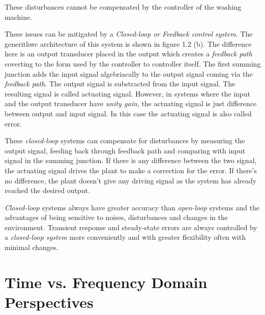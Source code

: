 \documentclass{report}
\begin{document}
These disturbances cannot be compensated by the controller of the washing machine.
\\
\par
These issues can be mitigated by a \textit{Closed-loop or Feedback control system}. The generithwc architecture of this system is shown in figure 1.2 (b). The difference here is an
output transducer placed in the output which creates a \textit{feedback path} coverting to the form used by the controller to controller itself. The first summing junction adds
the input signal algebriacally to the output signal coming via the \textit{feedback path}. The output signal is substracted from the input signal. The resulting signal is called
actuating signal. However, in systems where the input and the output transducer have \textit{unity gain}, the actuating signal is just difference between output and input signal. In this
case the actuating signal is also called error.
\\
\par
These \textit{closed-loop} systems can compensate for disturbances by measuring the output signal, feeding back through feedback path and comparing with input signal in the summing junction.
If there is any difference between the two signal, the actuating signal drives the plant to make a correction for the error. If there's no difference, the plant doesn't give any driving signal
as the system has already reached the desired output.
\\
\par
\textit{Closed-loop} systems always have greater accuracy than \textit{open-loop} systems and the advantages of being sensitive to noises, disturbances and changes in the environment.
Transient response and steady-state errors are always controlled by a \textit{closed-loop system} more conveniently and with greater flexibility often with minimal changes.

\chapter{Time vs. Frequency Domain Perspectives}
\end{document}

